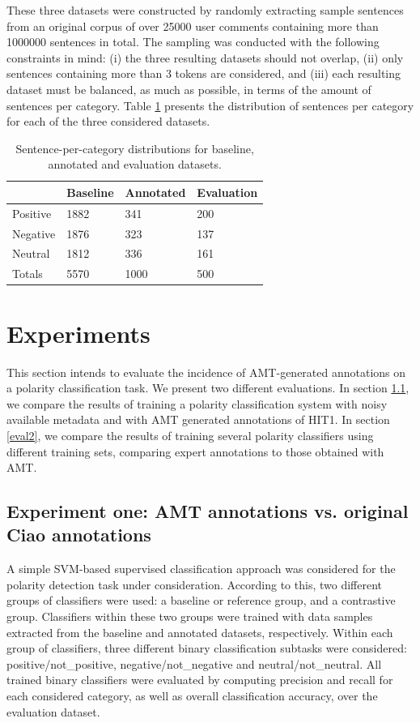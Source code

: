 \documentclass[11pt, a4paper,onecolumn]{article}
\begin{document}
These three datasets were constructed by randomly extracting sample sentences from an original corpus
of over 25000 user comments containing more than 1000000 sentences in total. The sampling was conducted 
with the following constraints in mind: (i) the three resulting datasets should not overlap, (ii) only sentences 
containing more than 3 tokens are considered, and (iii) each resulting dataset must be balanced, as much
as possible, in terms of the amount of sentences per category. Table \ref{tc_corpus} presents the
distribution of sentences per category for each of the three considered datasets.  

\begin{table}
\begin{center}
\begin{tabular}{|l|l|l|l|}
\hline
&Baseline &Annotated &Evaluation \\
\hline
Positive &1882 &341 &200 \\
\hline
Negative &1876 &323 &137 \\
\hline
Neutral &1812 &336 &161 \\
\hline
Totals &5570 &1000 &500 \\
\hline
\end{tabular}
\caption{Sentence-per-category distributions for baseline, annotated and evaluation datasets.}
\label{tc_corpus}
\end{center}
\end{table}

\section{Experiments}
\label{sect:classifier}


This section intends to evaluate the incidence of AMT-generated annotations on a polarity classification task. We present two different evaluations. In section \ref{eval1}, we compare the results of training a polarity classification system with noisy available metadata and with AMT generated annotations of HIT1. In section \ref{eval2}, we compare the results of training several polarity classifiers using different training sets, comparing expert annotations to those obtained with AMT.


\subsection{Experiment one: AMT annotations vs. original Ciao annotations}
\label{eval1}
A simple SVM-based supervised classification approach was considered for the
polarity detection task under consideration. According to this, two different groups of classifiers were 
used: a baseline or reference group, and a contrastive group. Classifiers within these two groups were
trained with data samples extracted from the baseline and annotated datasets, respectively. Within each group 
of classifiers, three different binary classification subtasks were considered: positive/not\_positive, 
negative/not\_negative and neutral/not\_neutral. All trained binary classifiers were evaluated by computing 
precision and recall for each considered category, as well as overall classification accuracy, over the 
evaluation dataset.
\end{document}
